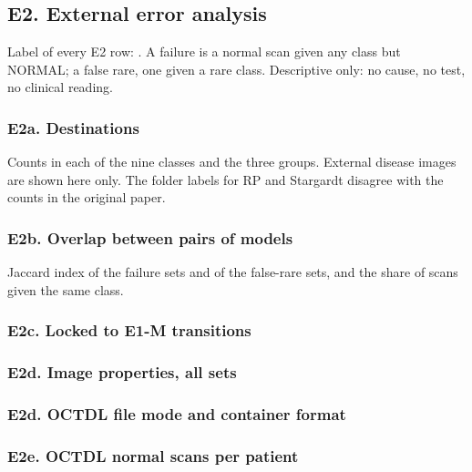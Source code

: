 \ifgen
\subsection*{E2. External error analysis}
Label of every E2 row: . A failure is a normal scan given any class but NORMAL; a false rare, one given a rare class. Descriptive only: no cause, no test, no clinical reading.
\fi
{}\ifgen
\subsubsection*{E2a. Destinations}
Counts in each of the nine classes and the three groups. External disease images are shown here only. \fnRS The folder labels for RP and Stargardt disagree with the counts in the original paper. 
{\scriptsize\setlength{\tabcolsep}{2.5pt}}
\fi
{}\ifgen
\subsubsection*{E2b. Overlap between pairs of models}
Jaccard index of the failure sets and of the false-rare sets, and the share of scans given the same class. 
{\scriptsize}
\fi
{}\ifgen
\subsubsection*{E2c. Locked to E1-M transitions}

{\scriptsize}
\fi
{}\ifgen
\subsubsection*{E2d. Image properties, all sets}

{\tiny\setlength{\tabcolsep}{2pt}}
\fi
{}\ifgen
\subsubsection*{E2d. OCTDL file mode and container format}
{\scriptsize}
\fi
{}\ifgen
\subsubsection*{E2e. OCTDL normal scans per patient}

\begin{center}\scriptsize\end{center}
\fi
{}\ifgen
